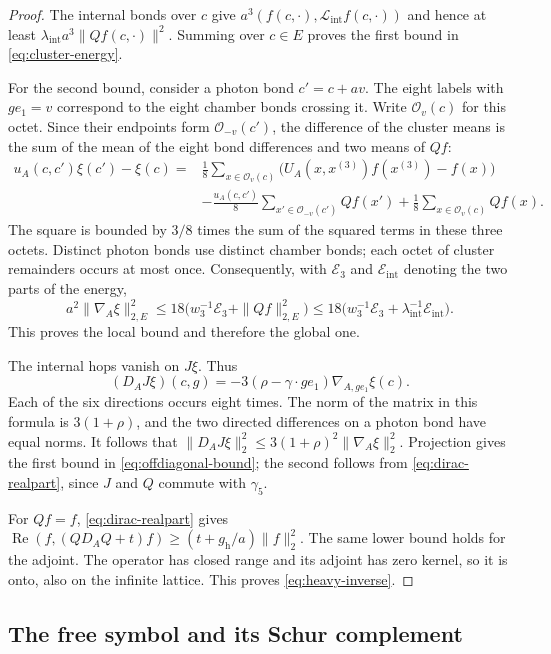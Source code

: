 \begin{proof}
The internal bonds over $c$ give
$a^3(f(c,\cdot),\mathcal L_{\mathrm{int}}f(c,\cdot))$ and hence at
least $\lambda_{\mathrm{int}}a^3\|Qf(c,\cdot)\|^2$. Summing over
$c\in E$ proves the first bound in \eqref{eq:cluster-energy}.

For the second bound, consider a photon bond $c'=c+av$. The eight
labels with $ge_1=v$ correspond to the eight chamber bonds crossing it.
Write $\mathcal O_v(c)$ for this octet. Since their endpoints form
$\mathcal O_{-v}(c')$, the difference of the cluster means is the sum
of the mean of the eight bond differences and two means of $Qf$:
\begin{align*}
 u_A(c,c')\xi(c')-\xi(c)
 ={}&\frac18\sum_{x\in\mathcal O_v(c)}
       \big(U_A(x,x^{(3)})f(x^{(3)})-f(x)\big)\\
 &-\frac{u_A(c,c')}8\sum_{x'\in\mathcal O_{-v}(c')}Qf(x')
   +\frac18\sum_{x\in\mathcal O_v(c)}Qf(x).
\end{align*}
The square is bounded by $3/8$ times the sum of the squared terms in
these three octets. Distinct photon bonds use distinct chamber bonds;
each octet of cluster remainders occurs at most once. Consequently,
with $\mathcal E_3$ and $\mathcal E_{\mathrm{int}}$ denoting the two
parts of the energy,
\[
 a^2\|\nabla_A\xi\|_{2,E}^2
 \le18\big(w_3^{-1}\mathcal E_3+\|Qf\|_{2,E}^2\big)
 \le18\big(w_3^{-1}\mathcal E_3+
                \lambda_{\mathrm{int}}^{-1}\mathcal E_{\mathrm{int}}\big).
\]
This proves the local bound and therefore the global one.

The internal hops vanish on $J\xi$. Thus
\[
 (D_AJ\xi)(c,g)=-3(\rho-\gamma\cdot ge_1)
                   \nabla_{A,ge_1}\xi(c).
\]
Each of the six directions occurs eight times. The norm of the matrix
in this formula is $3(1+\rho)$, and the two directed differences on a
photon bond have equal norms. It follows that
$\|D_AJ\xi\|_2^2\le3(1+\rho)^2\|\nabla_A\xi\|_2^2$.
Projection gives the first bound in \eqref{eq:offdiagonal-bound}; the
second follows from \eqref{eq:dirac-realpart}, since $J$ and $Q$ commute
with $\gamma_5$.

For $Qf=f$, \eqref{eq:dirac-realpart} gives
$\operatorname{Re}(f,(QD_AQ+t)f)\ge(t+g_{\mathrm h}/a)\|f\|_2^2$.
The same lower bound holds for the adjoint. The operator has closed
range and its adjoint has zero kernel, so it is onto, also on the
infinite lattice. This proves \eqref{eq:heavy-inverse}.
\end{proof}

\subsection{The free symbol and its Schur complement}
\label{subsec:schur-symbol}

